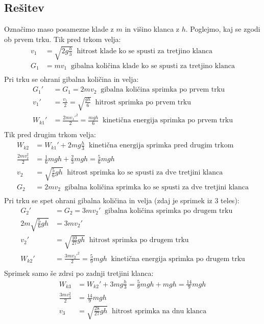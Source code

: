 \documentclass[a4,11pt]{article}
\begin{document}
\subsection*{Rešitev}
    Označimo maso posamezne klade z \(m\) in višino klanca z \(h\). Poglejmo, kaj se zgodi ob prvem trku.
    Tik pred trkom velja:
    \begin{align*}
        v_1 &= \sqrt{2g\frac{h}{3}} \ \text{ hitrost klade ko se spusti za tretjino klanca} \\
        G_1 &= m v_1 \ \text{ gibalna količina klade ko se spusti za tretjino klanca} \\
    \end{align*}
    Pri trku se ohrani gibalna količina in velja:
    \begin{align*}
        G_1' &= G_1 = 2m v_2 \ \text{ gibalna količina sprimka po prvem trku} \\
        v_1' &= \frac{v_1}{2} = \sqrt{\frac{gh}{6}}\ \text{ hitrost sprimka po prvem trku} \\
        W_{k1}' &= \frac{2m v_1'^2}{2} = \frac{m g h}{6}\ \text{ kinetična energija sprimka po prvem trku} \\
    \end{align*}
    Tik pred drugim trkom velja:
    \begin{align*}
        W_{k2} &= W_{k1}' + 2m g \frac{h}{3} \ \text{ kinetična energija sprimka pred drugim trkom} \\
        \frac{2mv_2^2}{2} &= \frac{1}{6}mgh + \frac{2}{3}mgh = \frac{5}{6}mgh \\
        v_2 &= \sqrt{\frac{5}{6}gh} \ \text{ hitrost sprimka ko se spusti za dve tretjini klanca} \\
        G_2 &= 2m v_2 \ \text{ gibalna količina sprimka ko se spusti za dve tretjini klanca} \\
    \end{align*}
    Pri trku se spet ohrani gibalna količina in velja (zdaj je sprimek iz 3 teles):
    \begin{align*}
        G_2' &= G_2 = 3m v_2' \ \text{ gibalna količina sprimka po drugem trku} \\
        2m \sqrt{\frac{5}{6}gh} &= 3m v_2' \\
        v_2' &= \sqrt{\frac{10}{27}gh} \ \text{ hitrost sprimka po drugem trku} \\
        W_{k2}' &= \frac{3m v_2'^2}{2} = \frac{5}{9}mgh \ \text{ kinetična energija sprimka po drugem trku} \\
    \end{align*}
    Sprimek samo še zdrsi po zadnji tretjini klanca:
    \begin{align*}
        W_{k3} &= W_{k2}' + 3m g \frac{h}{3} = \frac{5}{9}mgh + mgh = \frac{14}{9}mgh\\
        \frac{3mv_3^2}{2} &= \frac{14}{9}mgh \\
        v_3 &= \sqrt{\frac{28}{27}gh} \ \text{ hitrost sprimka na dnu klanca} \\
    \end{align*}
\end{document}
